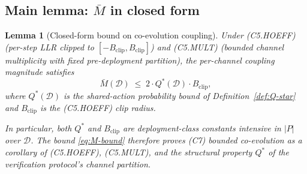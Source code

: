 \documentclass{article}
\newtheorem{lemma}{Lemma}
\newcommand{\Bclip}{B_{\mathrm{clip}}}
\begin{document}
\subsection{Main lemma: $\bar{M}$ in closed form}

\begin{lemma}[Closed-form bound on co-evolution coupling]
\label{lem:c7-closed-form}
Under (C5.HOEFF) (per-step LLR clipped to $[-\Bclip, \Bclip]$) and
(C5.MULT) (bounded channel multiplicity with fixed pre-deployment
partition), the per-channel coupling magnitude satisfies
\begin{equation}
\label{eq:M-bound}
  \bar{M}(\mathcal{D}) \;\leq\; 2 \cdot Q^*(\mathcal{D}) \cdot \Bclip,
\end{equation}
where $Q^*(\mathcal{D})$ is the shared-action probability bound of
Definition~\ref{def:Q-star} and $\Bclip$ is the (C5.HOEFF) clip
radius.

In particular, both $Q^*$ and $\Bclip$ are deployment-class
constants intensive in $|P|$ over $\mathcal{D}$.  The bound
\eqref{eq:M-bound} therefore proves (C7) bounded co-evolution as a
corollary of (C5.HOEFF), (C5.MULT), and the structural property
$Q^*$ of the verification protocol's channel partition.
\end{lemma}
\end{document}
